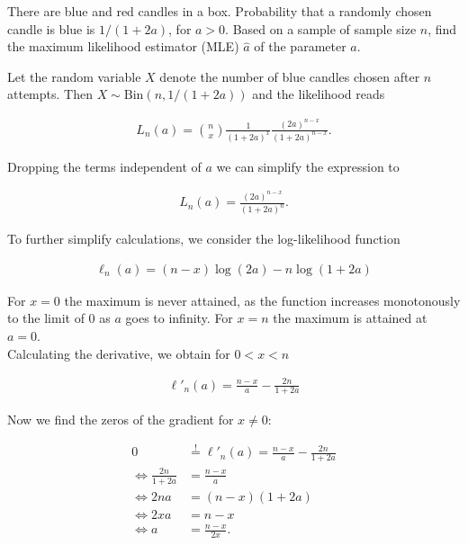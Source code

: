 
\begin{exercise}

There are blue and red candles in a box. Probability that a randomly chosen candle
is blue is $1/(1 + 2a)$, for $a > 0$. Based on a sample of sample size $n$, find
the maximum likelihood estimator (MLE) $\hat{a}$ of the parameter $a$.

\end{exercise}


\begin{solution}

Let the random variable $X$ denote the number of blue candles chosen after $n$ attempts.
Then $X \sim \text{Bin}(n, 1/(1 + 2a))$ and the likelihood reads

\begin{align*}
  L_n(a) = \binom{n}{x}\frac{1}{(1 + 2a)^x}\frac{(2a)^{n-x}}{(1 + 2a)^{n-x}}.
\end{align*}

Dropping the terms independent of $a$ we can simplify the expression to

\begin{align*}
  L_n(a) = \frac{(2a)^{n-x}}{(1 + 2a)^{n}}.
\end{align*}

To further simplify calculations, we consider the log-likelihood function

\begin{align*}
  \ell_n(a) = (n-x)\log(2a) - n\log(1 + 2a)
\end{align*}

For $x = 0$ the maximum is never attained, as the function
increases monotonously to the limit of 0 as $a$ goes to infinity.
For $x = n$ the maximum is attained at $a = 0$. \\
Calculating the derivative, we obtain for $0 < x < n$

\begin{align*}
  \ell'_n(a) = \frac{n-x}{a} - \frac{2n}{1 + 2a}
\end{align*}


Now we find the zeros of the gradient for $x \neq 0$:

\begin{align*}
  0 &\stackrel{!}{=} \ell'_n(a) = \frac{n-x}{a} - \frac{2n}{1 + 2a} \\
  \iff \frac{2n}{1 + 2a} &= \frac{n-x}{a} \\
  \iff 2na &= (n-x)(1 + 2a) \\
  \iff 2xa &= n-x \\
  \iff a &= \frac{n-x}{2x}.
\end{align*}


\end{solution}
